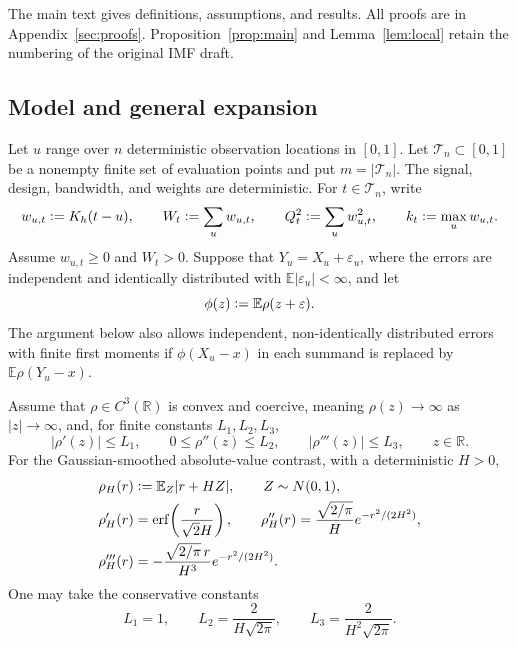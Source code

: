 \documentclass[11pt]{article}
\newcommand{\E}{\mathbb{E}}
\newcommand{\R}{\mathbb{R}}
\newcommand{\eqdef}{\mathrel{\vcentcolon=}}
\newcommand{\rhohu}{\rho}
\newcommand{\rhohum}{\phi}
\newcommand{\Kern}{K}
\newcommand{\Signal}{X}
\newcommand{\Data}{Y}
\begin{document}
The main text gives definitions, assumptions, and results.  All proofs are in
Appendix~\ref{sec:proofs}.  Proposition~\ref{prop:main} and
Lemma~\ref{lem:local} retain the numbering of the original IMF draft.

\clearpage
\subsection{Model and general expansion}\label{sec:model}

Let \(u\) range over \(n\) deterministic observation locations in \([0,1]\).
Let \(\mathcal T_n\subset[0,1]\) be a nonempty finite set of evaluation points
and put \(m=|\mathcal T_n|\).  The signal, design, bandwidth, and weights are
deterministic.  For \(t\in\mathcal T_n\), write
\begin{equation}
  w_{u,t}\eqdef \Kern_h(t-u),\qquad
  W_t\eqdef\sum_u w_{u,t},\qquad
  Q_t^2\eqdef\sum_u w_{u,t}^2,\qquad
  k_t\eqdef\max_u w_{u,t}.
  \label{eq:weights}
\end{equation}
Assume \(w_{u,t}\geq0\) and \(W_t>0\).  Suppose that
\(\Data_u=\Signal_u+\varepsilon_u\), where the errors are independent and
identically distributed with \(\E|\varepsilon_u|<\infty\), and let
\begin{equation}
  \rhohum(z)\eqdef\E\rhohu(z+\varepsilon).
  \label{eq:phi}
\end{equation}
The argument below also allows independent, non-identically distributed errors
with finite first moments if \(\rhohum(\Signal_u-x)\) in each summand is replaced by
\(\E\rhohu(\Data_u-x)\).

Assume that \(\rhohu\in C^3(\R)\) is convex and coercive, meaning
\(\rhohu(z)\to\infty\) as \(|z|\to\infty\), and, for finite constants
\(L_1,L_2,L_3\),
\begin{equation}
  |\rhohu'(z)|\leq L_1,\qquad
  0\leq\rhohu''(z)\leq L_2,\qquad
  |\rhohu'''(z)|\leq L_3,
  \qquad z\in\R.
  \label{eq:derivative-bounds}
\end{equation}
For the Gaussian-smoothed absolute-value contrast, with a deterministic \(H>0\),
\begin{align}
  \rho_H(r)&\eqdef\E_Z|r+HZ|,\qquad Z\sim N(0,1),\notag\\
  \rho_H'(r)&=\operatorname{erf}\!\left(\frac{r}{\sqrt2H}\right),\qquad
  \rho_H''(r)=\frac{\sqrt{2/\pi}}{H}e^{-r^2/(2H^2)},\notag\\
  \rho_H'''(r)&=-\frac{\sqrt{2/\pi}\,r}{H^3}e^{-r^2/(2H^2)}.
  \label{eq:smooth-abs}
\end{align}
One may take the conservative constants
\begin{equation}
  L_1=1,\qquad
  L_2=\frac{2}{H\sqrt{2\pi}},\qquad
  L_3=\frac{2}{H^2\sqrt{2\pi}}.
  \label{eq:rhoH-constants}
\end{equation}
\end{document}
